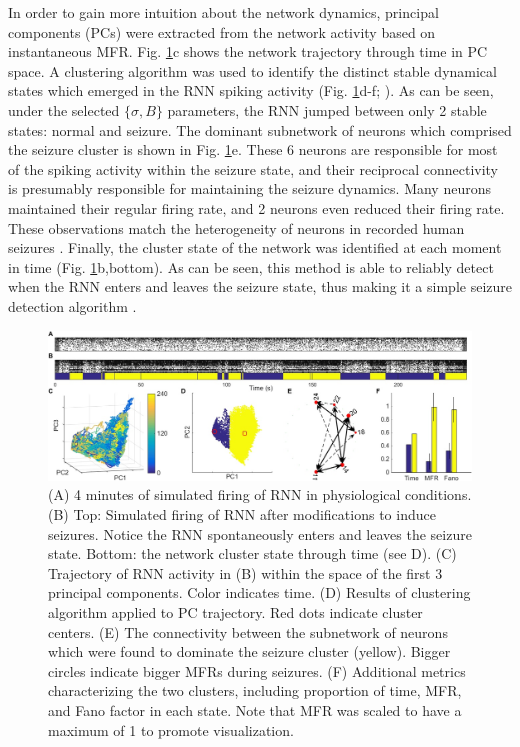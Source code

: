 \documentclass[11pt,a4paper,final]{article}
\begin{document}
In order to gain more intuition about the network dynamics, principal components (PCs) were extracted from the network activity based on instantaneous MFR.
Fig. \ref{seizure}c shows the network trajectory through time in PC space.
A clustering algorithm was used to identify the distinct stable dynamical states which emerged in the RNN spiking activity (Fig. \ref{seizure}d-f; \citet{sasaki07,santaniello14}).
As can be seen, under the selected $\{\sigma,B\}$ parameters, the RNN jumped between only 2 stable states: normal and seizure.
The dominant subnetwork of neurons which comprised the seizure cluster is shown in Fig. \ref{seizure}e.
These 6 neurons are responsible for most of the spiking activity within the seizure state, and their reciprocal connectivity is presumably responsible for maintaining the seizure dynamics.
Many neurons maintained their regular firing rate, and 2 neurons even reduced their firing rate.
These observations match the heterogeneity of neurons in recorded human seizures \citep{bower12}.
Finally, the cluster state of the network was identified at each moment in time (Fig. \ref{seizure}b,bottom).
As can be seen, this method is able to reliably detect when the RNN enters and leaves the seizure state, thus  making it a simple seizure detection algorithm \citep{mormann07,cook13,netoff15}.

\begin{figure}[!ht]
\centering
\includegraphics[width=180mm]{seizure}
\caption[Seizure Induction]{
	(A) 4 minutes of simulated firing of RNN in physiological conditions.
	(B) Top: Simulated firing of RNN after modifications to induce seizures. Notice the RNN spontaneously enters and leaves the seizure state.
	    Bottom: the network cluster state through time (see D).
	(C) Trajectory of RNN activity in (B) within the space of the first 3 principal components. Color indicates time.
	(D) Results of clustering algorithm applied to PC trajectory. Red dots indicate cluster centers.
	(E) The connectivity between the subnetwork of neurons which were found to dominate the seizure cluster (yellow). Bigger circles indicate bigger MFRs during seizures.
	(F) Additional metrics characterizing the two clusters, including proportion of time, MFR, and Fano factor in each state. Note that MFR was scaled to have a maximum of 1 to promote visualization.
}
\label{seizure}
\end{figure}
\end{document}
